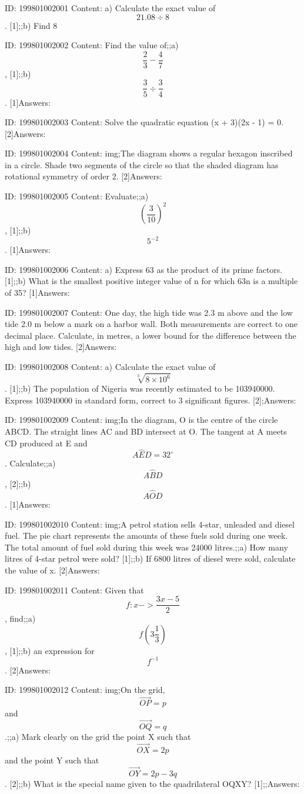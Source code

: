 \documentclass{article}
\begin{document}
ID: 199801002001
Content:
a) Calculate the exact value of $$21.08 \div 8$$. [1];;b) Find 8%

ID: 199801002002
Content:
Find the value of;;a) $$\frac{2}{3}-\frac{4}{7}$$, [1];;b) $$\frac{3}{5}\div \frac{3}{4}$$. [1]Answers:

ID: 199801002003
Content:
Solve the quadratic equation (x + 3)(2x - 1) = 0. [2]Answers:

ID: 199801002004
Content:
img;The diagram shows a regular hexagon inscribed in a circle. Shade two segments of the circle so that the shaded diagram has rotational symmetry of order 2. [2]Answers:

ID: 199801002005
Content:
Evaluate;;a) $$(\frac{3}{10})^2$$, [1];;b) $$5^{-2}$$. [1]Answers:

ID: 199801002006
Content:
a) Express 63 as the product of its prime factors. [1];;b) What is the smallest positive integer value of n for which 63n is a multiple of 35? [1]Answers:

ID: 199801002007
Content:
One day, the high tide was 2.3 m above and the low tide 2.0 m below a mark on a harbor wall. Both measurements are correct to one decimal place. Calculate, in metres, a lower bound for the difference between the high and low tides. [2]Answers:

ID: 199801002008
Content:
a) Calculate the exact value of $$\sqrt[3]{8 \times 10^6}$$. [1];;b) The population of Nigeria was recently estimated to be 103940000. Express 103940000 in standard form, correct to 3 significant figures. [2];Answers:

ID: 199801002009
Content:
img;In the diagram, O is the centre of the circle ABCD. The straight lines AC and BD intersect at O. The tangent at A meets CD produced at E and $$A \hat ED=32^{\circ}$$. Calculate;;a) $$A \hat BD$$, [2];;b) $$A \hat OD$$. [1]Answers:

ID: 199801002010
Content:
img;A petrol station sells 4-star, unleaded and diesel fuel. The pie chart represents the amounts of these fuels sold during one week. The total amount of fuel sold during this week was 24000 litres.;;a) How many litres of 4-star petrol were sold? [1];;b) If 6800 litres of diesel were sold, calculate the value of x. [2]Answers:

ID: 199801002011
Content:
Given that  $$f:x->\frac{3x-5}{2}$$, find;;a) $$f(3\frac{1}{3})$$, [1];;b) an expression for $$f^{-1}$$. [2]Answers:

ID: 199801002012
Content:
img;On the grid, $$\vec{OP}=p$$ and $$\vec{OQ}=q$$.;;a) Mark clearly on the grid the point X such that $$\vec{OX}=2p$$ and the point Y such that $$\vec{OY}=2p-3q$$. [2];;b) What is the special name given to the quadrilateral OQXY? [1];;Answers:
\end{document}
